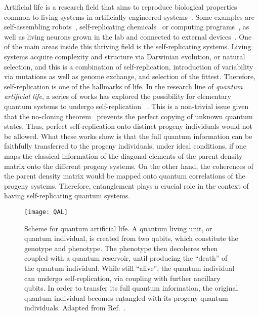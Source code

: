 \documentclass[12pt]{iopart}
\begin{document}
Artificial life is a research field that aims to reproduce biological properties common to living systems in artificially engineered systems~\cite{al1,alReview}. Some examples are self-assembling robots~\cite{aiSAR}, self-replicating chemicals~\cite{aiChemEvol} or computing programs~\cite{alPrograms}, as well as living neurons grown in the lab and connected to external devices~\cite{aiSyntBio}. One of the main areas inside this thriving field is the self-replicating systems. Living systems acquire complexity and structure via Darwinian evolution, or natural selection, and this is a combination of self-replication, introduction of variability via mutations as well as genome exchange, and selection of the fittest. Therefore, self-replication is one of the hallmarks of life. In the research line of {\it quantum artificial life}, a series of works has explored the possibility for elementary quantum systems to undergo self-replication~\cite{qubiom1,qubiom2,qubiom3} . This is a non-trivial issue given that the no-cloning theorem~\cite{WootersZurek} prevents the perfect copying of unknown quantum states. Thus, perfect self-replication onto distinct progeny individuals would not be allowed. What these works show is that the full quantum information can be faithfully transferred to the progeny individuals, under ideal conditions, if one maps the classical information of the diagonal elements of the parent density matrix onto the different progeny systems. On the other hand, the coherences of the parent density matrix would be mapped onto quantum correlations of the progeny systems. Therefore, entanglement plays a crucial role in the context of having self-replicating quantum systems.

\begin{figure}[h!]
\begin{center}
\texttt{[image: QAL]}
\caption{Scheme for quantum artificial life. A quantum living unit, or quantum individual, is created from two qubits, which constitute the genotype and phenotype. The phenotype then decoheres when coupled with a quantum reservoir, until producing the ``death'' of the quantum individual. While still ``alive'',  the quantum individual can undergo self-replication, via coupling with further ancillary qubits. In order to transfer its full quantum information, the original quantum individual becomes entangled with its progeny quantum individuals. Adapted from Ref.~\cite{qubiom2}.}
\label{QbiomTheory}
\end{center}
\end{figure} 
\end{document}

